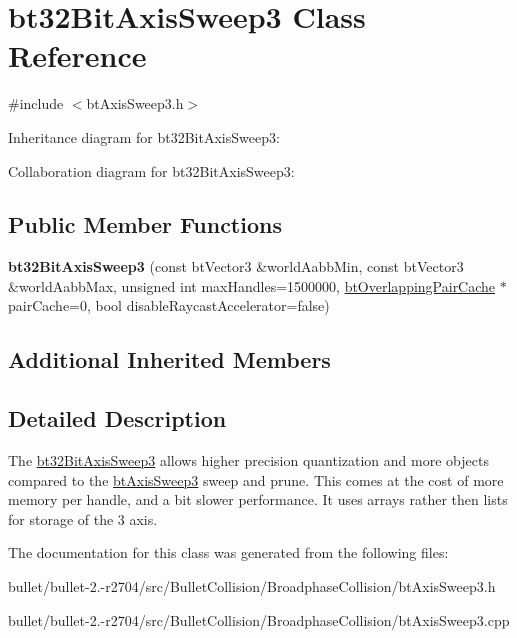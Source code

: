 \hypertarget{classbt32_bit_axis_sweep3}{\section{bt32\+Bit\+Axis\+Sweep3 Class Reference}
\label{classbt32_bit_axis_sweep3}
}


{\ttfamily \#include $<$bt\+Axis\+Sweep3.\+h$>$}



Inheritance diagram for bt32\+Bit\+Axis\+Sweep3\+:


Collaboration diagram for bt32\+Bit\+Axis\+Sweep3\+:
\subsection*{Public Member Functions}
\begin{DoxyCompactItemize}
\item 
\hypertarget{classbt32_bit_axis_sweep3_ae7ee848aa92265c338ae1bbe125f880d}{{\bfseries bt32\+Bit\+Axis\+Sweep3} (const bt\+Vector3 \&world\+Aabb\+Min, const bt\+Vector3 \&world\+Aabb\+Max, unsigned int max\+Handles=1500000, \hyperlink{classbt_overlapping_pair_cache}{bt\+Overlapping\+Pair\+Cache} $\ast$pair\+Cache=0, bool disable\+Raycast\+Accelerator=false)}\label{classbt32_bit_axis_sweep3_ae7ee848aa92265c338ae1bbe125f880d}

\end{DoxyCompactItemize}
\subsection*{Additional Inherited Members}


\subsection{Detailed Description}
The \hyperlink{classbt32_bit_axis_sweep3}{bt32\+Bit\+Axis\+Sweep3} allows higher precision quantization and more objects compared to the \hyperlink{classbt_axis_sweep3}{bt\+Axis\+Sweep3} sweep and prune. This comes at the cost of more memory per handle, and a bit slower performance. It uses arrays rather then lists for storage of the 3 axis. 

The documentation for this class was generated from the following files\+:\begin{DoxyCompactItemize}
\item 
bullet/bullet-\/2.-\/r2704/src/\+Bullet\+Collision/\+Broadphase\+Collision/bt\+Axis\+Sweep3.\+h\item 
bullet/bullet-\/2.-\/r2704/src/\+Bullet\+Collision/\+Broadphase\+Collision/bt\+Axis\+Sweep3.\+cpp\end{DoxyCompactItemize}
